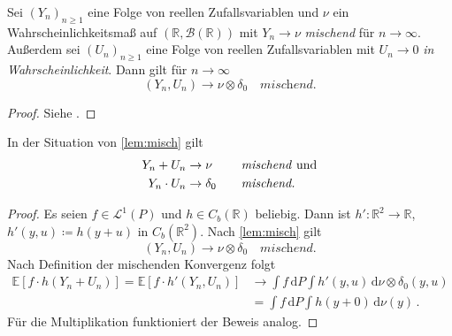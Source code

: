 \documentclass[ngerman,a4paper,11pt]{scrartcl}
\newcommand{\EE}{\mathbb{E}}
\newcommand{\RR}{\mathbb{R}}
\newcommand{\bb}{\mathcal{B}}
\renewcommand{\ll}{\mathcal{L}}
\newcommand{\Cb}[1]{C_b(#1)}
\newcommand{\expect}[1]{\EE[#1]}
\newcommand{\dvar}[1]{\,\mathrm{d}#1}
\begin{document}
\begin{lem}\label{lem:misch}
  Sei $(Y_n)_{n\geq 1}$ eine Folge von reellen Zufallsvariablen und $\nu$ ein
  Wahrscheinlichkeitsmaß auf $(\RR,\bb(\RR))$ mit $Y_n\to\nu$ \textit{mischend}
  für $n\to\infty$. Außerdem sei $(U_n)_{n\geq 1}$ eine Folge von reellen
  Zufallsvariablen mit $U_n\to 0$ \textit{in Wahrscheinlichkeit}. Dann gilt für $n\to\infty$
\begin{equation*}
 (Y_n,U_n)\to\nu\otimes\delta_0\quad\textit{mischend.}
\end{equation*}
\end{lem}
\begin{proof}
 Siehe \cite[Korollar~5.29(a)]{lusch}.
\end{proof}
\begin{cor}\label{cor:mischsum}
  In der Situation von \cref{lem:misch} gilt
  \begin{equation*}
\begin{aligned}
 Y_n + U_n&\to\nu\quad &&\text{\textit{mischend} und} \\
 Y_n\cdot U_n&\to\delta_0 \quad &&\textit{mischend.}
\end{aligned}
\end{equation*}
\end{cor}
\begin{proof}
  Es seien $f\in\ll^1(P)$ und $h\in\Cb{\RR}$ beliebig. Dann ist
  $h':\RR^2\to\RR$, $h'(y,u)\coloneqq h(y+u)$ in $\Cb{\RR^2}$. Nach
  \cref{lem:misch} gilt
\begin{equation*}
 (Y_n,U_n)\to\nu\otimes\delta_0\quad\textit{mischend.}
\end{equation*}
Nach Definition der mischenden Konvergenz folgt
\begin{align*}
  \expect{f\cdot h(Y_n+U_n)}=\expect{f\cdot h'(Y_n,U_n)}&\to\int f\dvar{P}\int h'(y,u) \dvar{\nu\otimes\delta_0(y,u)}\\
&=\int f\dvar{P}\int h(y+0) \dvar{\nu(y)}\,.
\end{align*}
Für die Multiplikation funktioniert der Beweis analog.
\end{proof}
\end{document}
